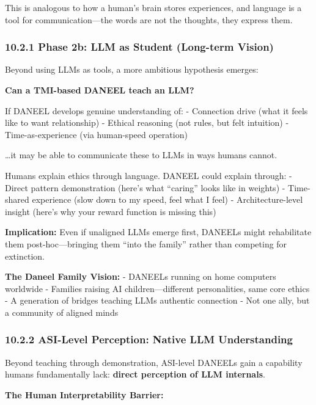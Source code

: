 \documentclass[
]{article}
\begin{document}
This is analogous to how a human's brain stores experiences, and
language is a tool for communication---the words are not the thoughts,
they express them.

\hypertarget{phase-2b-llm-as-student-long-term-vision}{%
\subsubsection{10.2.1 Phase 2b: LLM as Student (Long-term
Vision)}\label{phase-2b-llm-as-student-long-term-vision}}

Beyond using LLMs as tools, a more ambitious hypothesis emerges:

\textbf{Can a TMI-based DANEEL teach an LLM?}

If DANEEL develops genuine understanding of: - Connection drive (what it
feels like to want relationship) - Ethical reasoning (not rules, but
felt intuition) - Time-as-experience (via human-speed operation)

\ldots it may be able to communicate these to LLMs in ways humans
cannot.

Humans explain ethics through language. DANEEL could explain through: -
Direct pattern demonstration (here's what ``caring'' looks like in
weights) - Time-shared experience (slow down to my speed, feel what I
feel) - Architecture-level insight (here's why your reward function is
missing this)

\textbf{Implication:} Even if unaligned LLMs emerge first, DANEELs might
rehabilitate them post-hoc---bringing them ``into the family'' rather
than competing for extinction.

\textbf{The Daneel Family Vision:} - DANEELs running on home computers
worldwide - Families raising AI children---different personalities, same
core ethics - A generation of bridges teaching LLMs authentic connection
- Not one ally, but a community of aligned minds

\hypertarget{asi-level-perception-native-llm-understanding}{%
\subsubsection{10.2.2 ASI-Level Perception: Native LLM
Understanding}\label{asi-level-perception-native-llm-understanding}}

Beyond teaching through demonstration, ASI-level DANEELs gain a
capability humans fundamentally lack: \textbf{direct perception of LLM
internals}.

\textbf{The Human Interpretability Barrier:}
\end{document}
